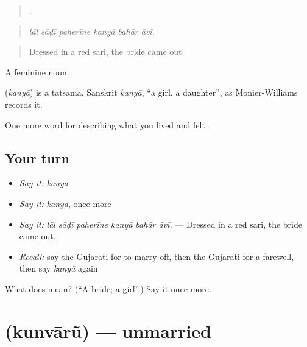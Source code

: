 \begin{quote}
     .
\end{quote}

\begin{quote}
\emph{lāl sāḍī paherīne kanyā bahār āvī.}
\end{quote}

\begin{quote}
Dressed in a red sari, the bride came out.
\end{quote}

A feminine noun.

\begin{cousinweb}
\textbf{} (\emph{kanyā}) is a tatsama, Sanskrit \emph{kanyā}, \textquotedblleft{}a girl, a daughter\textquotedblright{}, as Monier-Williams records it.
\end{cousinweb}

\begin{grammarlens}[title={What you've built}]
One more word for describing what you lived and felt.
\end{grammarlens}

\subsection*{Your turn}
\begin{itemize}
\raggedright
  \item \emph{Say it:} \emph{kanyā}
  \item \emph{Say it:} \emph{kanyā}, once more
  \item \emph{Say it:} \emph{lāl sāḍī paherīne kanyā bahār āvī.} — Dressed in a red sari, the bride came out.
  \item \emph{Recall:} say the Gujarati for to marry off, then the Gujarati for a farewell, then say \emph{kanyā} again
\end{itemize}

\begin{tcolorbox}[breakable,colback=teal!4,colframe=teal!35!black,title={Before you move on}]
What does  mean? (\textquotedblleft{}A bride; a girl\textquotedblright{}.) Say it once more.
\end{tcolorbox}
\section[\texorpdfstring{\gu{કુંવારું} (kunvārũ)}{કુંવારું (kunvārũ)}]{ (kunvārũ) — unmarried}

